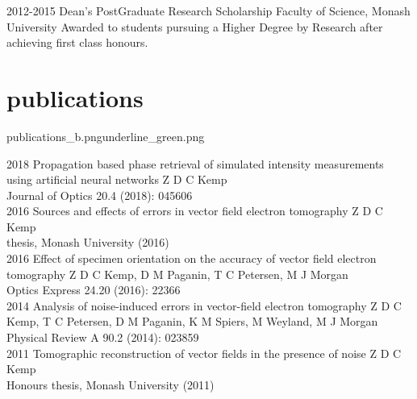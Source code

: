 \documentclass[a4paper]{friggeri-cv} %
\newcommand{\spacer}{\vspace{0.0cm}}
\begin{document}
\begin{entrylist}


\entry
{2012-2015\phantom{XXX}}
{Dean's PostGraduate Research Scholarship}
{Faculty of Science, Monash University}
{Awarded to students pursuing a Higher Degree by Research after achieving first class honours.}


\end{entrylist}


\newpage
{}

\spacer
\section{publications}{publications_b.png}{underline_green.png}
\begin{entrylist}
\entry
{2018}
{Propagation based phase retrieval of simulated intensity measurements using artificial neural networks}
{}
{Z D C Kemp\\ Journal of Optics 20.4 (2018): 045606\\}
\entry
{2016}
{Sources and effects of errors in vector field electron tomography}
{}
{Z D C Kemp\\ \phd{} thesis, Monash University (2016)\\}
\entry
{2016}
{Effect of specimen orientation on the accuracy of vector field electron tomography}
{}
{Z D C Kemp, D M Paganin, T C Petersen, M J Morgan\\Optics Express 24.20 (2016): 22366\\}
\entry
{2014}
{Analysis of noise-induced errors in vector-field electron tomography}
{}
{Z D C Kemp, T C Petersen, D M Paganin, K M Spiers, M Weyland, M J Morgan\\Physical Review A 90.2 (2014): 023859\\}
\entry
{2011}
{Tomographic reconstruction of vector fields in the presence of noise}
{}
{Z D C Kemp\\ Honours thesis, Monash University (2011)\\}
\end{entrylist}
\end{document}
